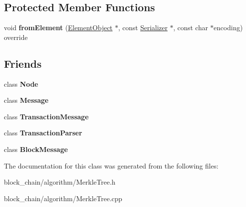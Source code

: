 \subsection*{Protected Member Functions}
\begin{DoxyCompactItemize}
\item 
\mbox{\label{classMerkleTree_a083ad348bfd770f2400f190112ff39a3}} 
void {\bfseries from\+Element} (\mbox{\hyperlink{classElementObject}{Element\+Object}} $\ast$, const \mbox{\hyperlink{classSerializer}{Serializer}} $\ast$, const char $\ast$encoding) override
\end{DoxyCompactItemize}
\subsection*{Friends}
\begin{DoxyCompactItemize}
\item 
\mbox{\label{classMerkleTree_a6db9d28bd448a131448276ee03de1e6d}} 
class {\bfseries Node}
\item 
\mbox{\label{classMerkleTree_a658ef47bd757fd5e0f13adab5a417ced}} 
class {\bfseries Message}
\item 
\mbox{\label{classMerkleTree_a6a4f3eb8755476d75f7f57cef4cd3853}} 
class {\bfseries Transaction\+Message}
\item 
\mbox{\label{classMerkleTree_a760b1478b5214c122458f0f19d45c127}} 
class {\bfseries Transaction\+Parser}
\item 
\mbox{\label{classMerkleTree_a9acb1bbbd9c9589da9453187cfb6a794}} 
class {\bfseries Block\+Message}
\end{DoxyCompactItemize}


The documentation for this class was generated from the following files\+:\begin{DoxyCompactItemize}
\item 
block\+\_\+chain/algorithm/Merkle\+Tree.\+h\item 
block\+\_\+chain/algorithm/Merkle\+Tree.\+cpp\end{DoxyCompactItemize}
